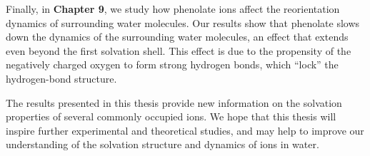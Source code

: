 Finally, in \textbf{Chapter 9}, we study how phenolate ions affect the reorientation dynamics of surrounding water molecules. Our results show that phenolate slows down the dynamics of the surrounding water molecules, an effect that extends even beyond the first solvation shell. This effect is due to the propensity of the negatively charged oxygen to form strong hydrogen bonds, which ``lock'' the hydrogen-bond structure.


The results presented in this thesis provide new information on the solvation properties of several commonly occupied ions. We hope that this thesis will inspire further experimental and theoretical studies, and may help to improve our understanding of the solvation structure and dynamics of ions in water.




